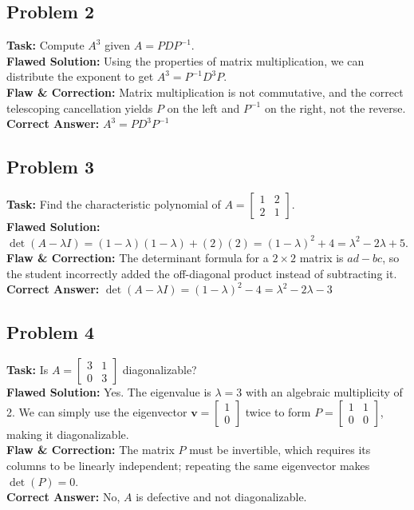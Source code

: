 \documentclass[11pt, a4paper]{article}
\theoremstyle{definition}
\theoremstyle{remark}
\begin{document}
\subsection{Problem 2}
\textbf{Task:} Compute $A^3$ given $A = PDP^{-1}$. \\
\textbf{Flawed Solution:} Using the properties of matrix multiplication, we can distribute the exponent to get $A^3 = P^{-1}D^3P$. \\
\textbf{Flaw \& Correction:} Matrix multiplication is not commutative, and the correct telescoping cancellation yields $P$ on the left and $P^{-1}$ on the right, not the reverse. \\
\textbf{Correct Answer:} $\displaystyle A^3 = PD^3P^{-1}$

\subsection{Problem 3}
\textbf{Task:} Find the characteristic polynomial of $A = \begin{bmatrix} 1 & 2 \\ 2 & 1 \end{bmatrix}$. \\
\textbf{Flawed Solution:} $\det(A - \lambda I) = (1-\lambda)(1-\lambda) + (2)(2) = (1-\lambda)^2 + 4 = \lambda^2 - 2\lambda + 5$. \\
\textbf{Flaw \& Correction:} The determinant formula for a $2 \times 2$ matrix is $ad - bc$, so the student incorrectly added the off-diagonal product instead of subtracting it. \\
\textbf{Correct Answer:} $\displaystyle \det(A - \lambda I) = (1-\lambda)^2 - 4 = \lambda^2 - 2\lambda - 3$

\subsection{Problem 4}
\textbf{Task:} Is $A = \begin{bmatrix} 3 & 1 \\ 0 & 3 \end{bmatrix}$ diagonalizable? \\
\textbf{Flawed Solution:} Yes. The eigenvalue is $\lambda=3$ with an algebraic multiplicity of 2. We can simply use the eigenvector $\mathbf{v} = \begin{bmatrix} 1 \\ 0 \end{bmatrix}$ twice to form $P = \begin{bmatrix} 1 & 1 \\ 0 & 0 \end{bmatrix}$, making it diagonalizable. \\
\textbf{Flaw \& Correction:} The matrix $P$ must be invertible, which requires its columns to be linearly independent; repeating the same eigenvector makes $\det(P) = 0$. \\
\textbf{Correct Answer:} No, $A$ is defective and not diagonalizable.
\end{document}
